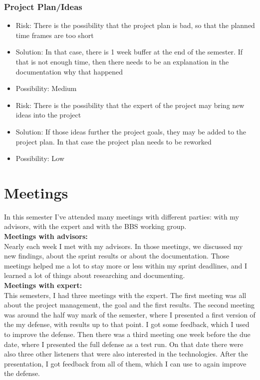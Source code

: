 \documentclass[
	a4paper               %
	,BCOR=0mm            %
	,bibliography=totoc   %
	,listof=totoc         %
	,monolingual
	,twoside=false
]{bfhthesis}              %
\begin{document}
\subsection{Project Plan/Ideas}
\begin{itemize}
	\item Risk: There is the possibility that the project plan is bad, so that the planned time frames are too short
	\item Solution: In that case, there is 1 week buffer at the end of the semester. If that is not enough time, then there needs to be an explanation in the documentation why that happened
	\item Possibility: Medium
\end{itemize}
\begin{itemize}
	\item Risk: There is the possibility that the expert of the project may bring new ideas into the project
	\item Solution: If those ideas further the project goals, they may be added to the project plan. In that case the project plan needs to be reworked
	\item Possibility: Low
\end{itemize}


\chapter{Meetings}
In this semester I've attended many meetings with different parties: with my advisors, with the expert and with the BBS working group.\\

\noindent
\textbf{Meetings with advisors:}\\
Nearly each week I met with my advisors. In those meetings, we discussed my new findings, about the sprint results or about the documentation. Those meetings helped me a lot to stay more or less within my sprint deadlines, and I learned a lot of things about researching and documenting.\\

\noindent
\textbf{Meetings with expert:}\\
This semesters, I had three meetings with the expert. The first meeting was all about the project management, the goal and the first results. The second meeting was around the half way mark of the semester, where I presented a first version of the my defense, with results up to that point. I got some feedback, which I used to improve the defense. Then there was a third meeting one week before the due date, where I presented the full defense as a test run. On that date there were also three other listeners that were also interested in the technologies. After the presentation, I got feedback from all of them, which I can use to again improve the defense.\\
\end{document}

